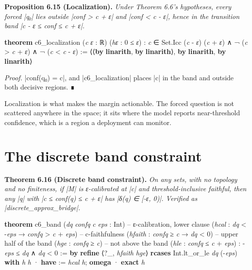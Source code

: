 \documentclass{memoir}
\begin{document}
\textbf{Proposition 6.15 (Localization).} \emph{Under Theorem 6.6's hypotheses, every forced
\LeanVerb|q₀| lies outside \LeanVerb|conf > c + ε| and \LeanVerb|conf < c - ε|, hence in the transition
band \LeanVerb|c - ε ≤ conf ≤ c + ε|.}

\begin{LeanVerbatim}
\textbf{theorem} c6_localization (\textit{c} \textit{ε} : ℝ) (\textit{hε} : 0 ≤ \textit{ε}) :
    \textit{c} ∈ Set.Icc (\textit{c} - \textit{ε}) (\textit{c} + \textit{ε}) ∧ ¬ (\textit{c} > \textit{c} + \textit{ε}) ∧ ¬
    (\textit{c} < \textit{c} - \textit{ε}) :=
  ⟨⟨\textbf{by} \textbf{linarith}, \textbf{by} \textbf{linarith}⟩, \textbf{by} \textbf{linarith}, \textbf{by} \textbf{linarith}⟩

\end{LeanVerbatim}


\emph{Proof.} \LeanVerb|conf(q₀) = c|, and \LeanVerb|c6_localization| places \LeanVerb|c| in the band and
outside both decisive regions. ∎

Localization is what makes the margin actionable. The forced question is not
scattered anywhere in the space; it sits where the model reports near-threshold
confidence, which is a region a deployment can monitor.



\section{The discrete band constraint}\label{Two--Schemas--of--Impossibility-005F-005F-005F--Machine--Checked--Limits--of--Trustworthy--Machine--Learning-005F-005F-005F--and--Why--They--Tighten--with--Capability----Approximate--Bridges--to--Real--Models----The--discrete--band--constraint}

\textbf{Theorem 6.16 (Discrete band constraint).} \emph{On any sets, with no topology and no
finiteness, if \LeanVerb|M| is ε-calibrated at \LeanVerb|c| and threshold-inclusive faithful, then
any \LeanVerb|q| with \LeanVerb|c ≤ conf(q) ≤ c + ε| has \LeanVerb|δ(q) ∈ [-ε, 0)|. Verified as
\LeanVerb|discrete_approx_bridge|.}

\begin{LeanVerbatim}
\textbf{theorem} c6_band (\textit{dq} \textit{confq} \textit{c} \textit{eps} : Int)
    -- ε-calibration, lower clause
    (\textit{hcal} : \textit{dq} < -\textit{eps} → \textit{confq} > \textit{c} + \textit{eps})
    -- c-faithfulness
    (\textit{hfaith} : \textit{confq} ≥ \textit{c} → \textit{dq} < 0)
    -- upper half of the band
    (\textit{hge} : \textit{confq} ≥ \textit{c})
    -- not above the band
    (\textit{hle} : \textit{confq} ≤ \textit{c} + \textit{eps}) :
    -\textit{eps} ≤ \textit{dq} ∧ \textit{dq} < 0 := \textbf{by}
  \textbf{refine} ⟨?_, \textit{hfaith} \textit{hge}⟩
  \textbf{rcases} Int.lt_or_le \textit{dq} (-\textit{eps}) \textbf{with} \textit{h}  \textit{h}
  · \textbf{have} := \textit{hcal} \textit{h}; \textbf{omega}
  · \textbf{exact} \textit{h}

\end{LeanVerbatim}
\end{document}
